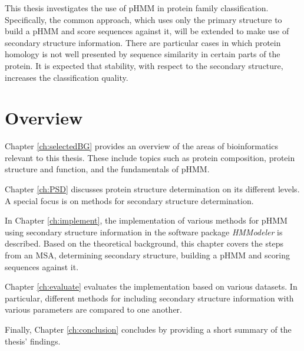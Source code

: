 This thesis investigates the use of \ac{pHMM} in protein family classification. Specifically, the common approach, which uses only the primary structure to build a \ac{pHMM} and score sequences against it, will be extended to make use of secondary structure information.  
There are particular cases in which protein homology is not well presented by sequence similarity in certain parts of the protein. It is expected that stability, with respect to the secondary structure, increases the classification quality.


\section{Overview}
Chapter \ref{ch:selectedBG} provides an overview of the areas of bioinformatics relevant to this thesis. These include topics such as protein composition, protein structure and function, and the fundamentals of \ac{pHMM}.

Chapter \ref{ch:PSD} discusses protein structure determination on its different levels. A special focus is on methods for secondary structure determination.

In Chapter \ref{ch:implement}, the implementation of various methods for \ac{pHMM} using secondary structure information in the software package \textit{HMModeler} is described.  Based on the theoretical background, this chapter covers the steps from an \ac{MSA}, determining secondary structure, building a \ac{pHMM} and scoring sequences against it.

Chapter \ref{ch:evaluate} evaluates the implementation based on various datasets. In particular, different methods for including secondary structure information with various parameters are compared to one another.

Finally, Chapter  \ref{ch:conclusion} concludes by providing a short summary of the thesis' findings.

